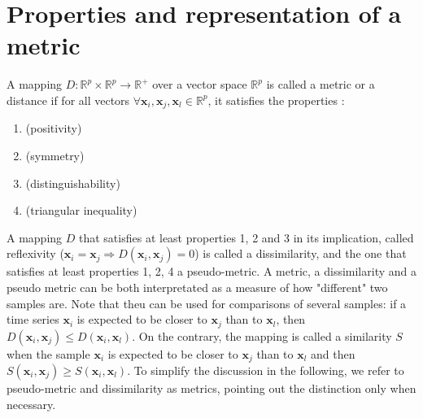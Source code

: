 \newpage
\section{Properties and representation of a metric}
\label{sec:property_metric}

A mapping $D:\mathbb{R}^p \times \mathbb{R}^p \rightarrow \mathbb{R}^+$ over a vector space $\mathbb{R}^p$ is called a metric or a distance if for all vectors $\forall \textbf{x}_i, \textbf{x}_j, \textbf{x}_l \in \mathbb{R}^p$, it satisfies the properties \cite{Deza2009}:
\begin{enumerate}
	\item { (positivity)}
	\item { (symmetry)}	
	\item { (distinguishability)}
	\item { (triangular inequality)}
\end{enumerate}
A mapping $D$ that satisfies at least properties 1, 2 and 3 in its implication, called reflexivity ($\textbf{x}_i=\textbf{x}_j \Rightarrow  D(\textbf{x}_i, \textbf{x}_j) = 0$) is called a dissimilarity, and the one that satisfies at least properties 1, 2, 4 a pseudo-metric. A metric, a dissimilarity and a pseudo metric can be both interpretated as a measure of how "different" two samples are. Note that theu can be used for comparisons of several samples: if a time series $\textbf{x}_i$ is expected to be closer to $\textbf{x}_j$ than to $\textbf{x}_l$, then $D(\textbf{x}_i,\textbf{x}_j) \leq D(\textbf{x}_i,\textbf{x}_l)$. On the contrary, the mapping is called a similarity $S$ when the sample $\textbf{x}_i$ is expected to be closer to $\textbf{x}_j$ than to $\textbf{x}_l$ and then $S(\textbf{x}_i,\textbf{x}_j) \geq S(\textbf{x}_i,\textbf{x}_l)$. To simplify the discussion in the following, we refer to pseudo-metric and dissimilarity as metrics, pointing out the distinction only when necessary.

